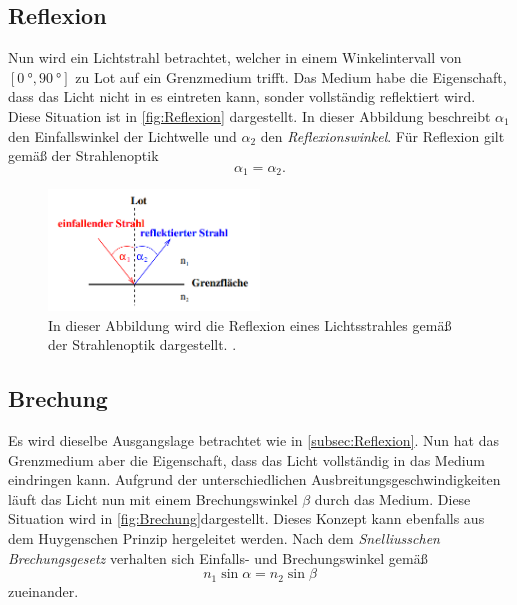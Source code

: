 \subsection{Reflexion}
\label{subsec:Reflexion}
Nun wird ein Lichtstrahl betrachtet, welcher in einem Winkelintervall von $[\qty{0}{\degree},\qty{90}{\degree}]$ zu Lot auf ein Grenzmedium trifft. Das Medium habe die 
Eigenschaft, dass das Licht nicht in es eintreten kann, sonder vollständig reflektiert wird. Diese Situation ist in \autoref{fig:Reflexion} dargestellt. In dieser Abbildung
beschreibt $\alpha_1$ den Einfallswinkel der Lichtwelle und $\alpha_2$ den \textit{Reflexionswinkel}. Für Reflexion gilt gemäß der Strahlenoptik 
\begin{equation}
  \label{eqn:Reflexionsgesetz}
  \alpha_1 = \alpha_2.
\end{equation}

\begin{figure}
  \centering
  \includegraphics[width=0.5\textwidth]{content/Reflexion.png}
  \caption{In dieser Abbildung wird die Reflexion eines Lichtsstrahles gemäß der Strahlenoptik dargestellt. \cite{v400}.}
  \label{fig:Reflexion}
\end{figure}

\subsection{Brechung}
\label{subsec:Brechung}
Es wird dieselbe Ausgangslage betrachtet wie in \autoref{subsec:Reflexion}. Nun hat das Grenzmedium aber die Eigenschaft, dass das Licht vollständig in das Medium eindringen
kann. Aufgrund der unterschiedlichen Ausbreitungsgeschwindigkeiten läuft das Licht nun mit einem Brechungswinkel $\beta$ durch das Medium. Diese Situation wird in 
\autoref{fig:Brechung}dargestellt. Dieses Konzept kann ebenfalls aus dem 
Huygenschen Prinzip hergeleitet werden. Nach dem \textit{Snelliusschen Brechungsgesetz} verhalten sich Einfalls- und Brechungswinkel gemäß
\begin{equation}
  \label{eqn:Brechung}
  n_1\sin\alpha = n_2\sin\beta
\end{equation}
zueinander.

